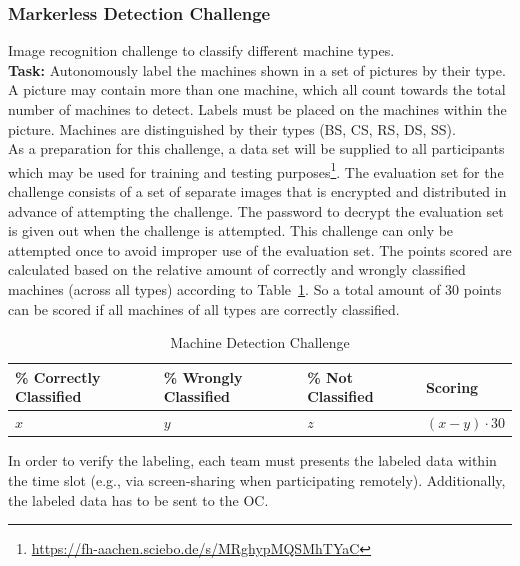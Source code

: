 \documentclass[12pt,twoside]{article}
\newcommand{\reftab}[1]{Table~\ref{#1}}
\begin{document}
\subsubsection{Markerless Detection Challenge}\label{sec:challenge-markerless}
Image recognition challenge to classify different machine types.\\
\textbf{Task:} Autonomously label the machines shown in a set of pictures
by their type.
A picture may contain more than one machine, which all count towards the
total number of machines to detect. Labels must be placed on the machines
within the picture. Machines are distinguished by their types
(BS, CS, RS, \ac{DS}, \ac{SS}).\\
As a preparation for this challenge, a data set will be supplied to
all participants which may be used for training and testing
purposes\footnote{\url{https://fh-aachen.sciebo.de/s/MRghypMQSMhTYaC}}.
The evaluation set for the challenge consists of a set of separate images that
is encrypted and distributed in advance of attempting the challenge.
The password to decrypt the evaluation set is given out when the challenge
is attempted.
This challenge can only be attempted once to avoid improper use of the
evaluation set.
The points scored are calculated based on the relative amount of correctly
and wrongly classified machines (across all types) according to
\reftab{tab:challenge-markerless}. So a total amount of 30 points can be scored
if all machines of all types are correctly classified.
\begin{table}[!htb]
 \centering
 \begin{tabularx}{\linewidth}{l|l|l|l}
  \% Correctly Classified & \% Wrongly Classified & \% Not Classified
  & Scoring \\\hline
  $x$ & $y$ & $z$ & $(x-y)\cdot30$
 \end{tabularx}
 \caption{Machine Detection Challenge}
 \label{tab:challenge-markerless}
\end{table}

In order to verify the labeling, each team must presents the labeled data
within the time slot (e.g., via screen-sharing when participating remotely).
Additionally, the labeled data has to be sent to the \ac{OC}.

\end{document}

